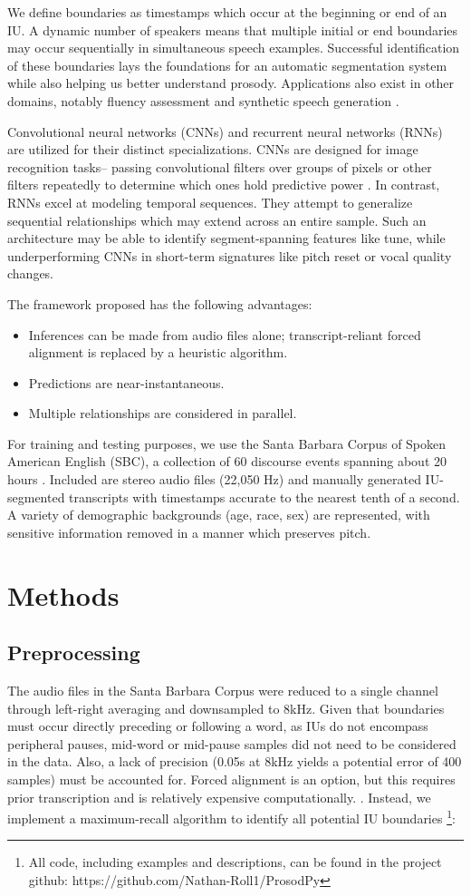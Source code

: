 \documentclass[conference]{IEEEtran}
\begin{document}
We define boundaries as timestamps which occur at the beginning or end of an IU. A dynamic number of speakers means that multiple initial or end boundaries may occur sequentially in simultaneous speech examples. Successful identification of these boundaries lays the foundations for an automatic segmentation system while also helping us better understand prosody. Applications also exist in other domains, notably fluency assessment and synthetic speech generation \cite{b4} \cite{b5}.

Convolutional neural networks (CNNs) and recurrent neural networks (RNNs) are utilized for their distinct specializations. CNNs are designed for image recognition tasks– passing convolutional filters over groups of pixels or other filters repeatedly to determine which ones hold predictive power \cite{b6}. In contrast, RNNs excel at modeling temporal sequences. They attempt to generalize sequential relationships which may extend across an entire sample. Such an architecture may be able to identify segment-spanning features like tune, while underperforming CNNs in short-term signatures like pitch reset or vocal quality changes.


The framework proposed has the following advantages:
\begin{itemize}
\item Inferences can be made from audio files alone; transcript-reliant forced alignment is replaced by a heuristic algorithm.
\item Predictions are near-instantaneous.
\item Multiple relationships are considered in parallel.
\end{itemize}
\smallskip
For training and testing purposes, we use the Santa Barbara Corpus of Spoken American English (SBC), a collection of 60 discourse events spanning about 20 hours \cite{b7}. Included are stereo audio files (22,050 Hz) and manually generated IU-segmented transcripts with timestamps accurate to the nearest tenth of a second. A variety of demographic backgrounds (age, race, sex) are represented, with sensitive information removed in a manner which preserves pitch.
\smallskip
\section{Methods}
\subsection{Preprocessing}\label{AA}
The audio files in the Santa Barbara Corpus were reduced to a single channel through left-right averaging and downsampled to 8kHz. Given that boundaries must occur directly preceding or following a word, as IUs do not encompass peripheral pauses, mid-word or mid-pause samples did not need to be considered in the data. Also, a lack of precision (0.05s at 8kHz yields a potential error of 400 samples) must be accounted for. Forced alignment is an option, but this requires prior transcription and is relatively expensive computationally. \cite{b8}. Instead, we implement a maximum-recall algorithm to identify all potential IU boundaries \footnote{All code, including examples and descriptions, can be found in the project github: https://github.com/Nathan-Roll1/ProsodPy}:
\end{document}
